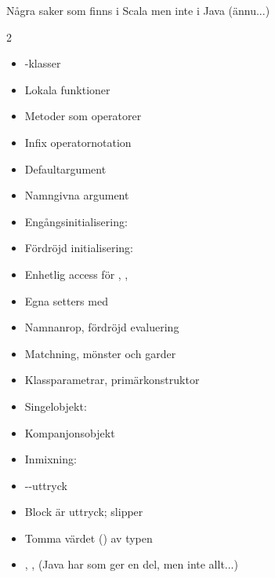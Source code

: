 \begin{Slide}{Några saker som finns i Scala men inte i Java (ännu...)}\SlideFontTiny
\ifkompendium\else
\vspace{-1em}\begin{multicols}{2}
\fi
\begin{itemize}
\item {}-klasser

\item Lokala funktioner

\item Metoder som operatorer

\item Infix operatornotation

\item Defaultargument

\item Namngivna argument

\item Engångsinitialisering: 

\item Fördröjd initialisering: 

\item Enhetlig access för , , 

\item Egna setters med 

\item Namnanrop, fördröjd evaluering

\item Matchning, mönster och garder

\item Klassparametrar, primärkonstruktor

\item Singelobjekt: 

\item Kompanjonsobjekt

\item Inmixning: 

\item {}--uttryck

\item Block är uttryck; slipper 

\item Tomma värdet () av typen 

\item {}, ,   (Java har  som ger en del, men inte allt...)


\end{itemize}
\end{multicols}
\end{Slide}
